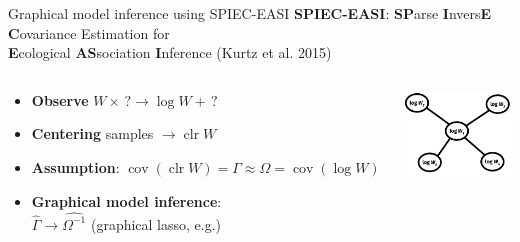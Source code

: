 \documentclass[professionalfonts]{beamer}
\newcommand{\clr}{\operatorname{clr}}
\newcommand{\cov}{\operatorname{cov}}
\begin{document}
\begin{frame}{Graphical model inference using SPIEC-EASI}
\textbf{SPIEC-EASI}: \textbf{SP}arse \textbf{I}nvers\textbf{E} \textbf{C}ovariance Estimation for \\ \textbf{E}cological \textbf{AS}sociation \textbf{I}nference (Kurtz et al. 2015)
\begin{columns}
\begin{column}{0.6\textwidth}
\begin{itemize}
\item \textbf{Observe} $W \times\,? \rightarrow \log W +\,?$
\item \textbf{Centering} samples $\rightarrow \clr W$
\item \textbf{Assumption}: $\cov(\clr W) = \Gamma \approx \Omega = \cov(\log W)$
\item \textbf{Graphical model inference}: \\ $\widehat{\Gamma} \rightarrow \widehat{\Omega^{-1}}$ (graphical lasso, e.g.)
\end{itemize}
\end{column}
\begin{column}{0.4\textwidth}
\begin{center}
\includegraphics[width=110px]{figs/graph-model-log.pdf}
\end{center}
\end{column}
\end{columns}
\end{frame}
\end{document}
